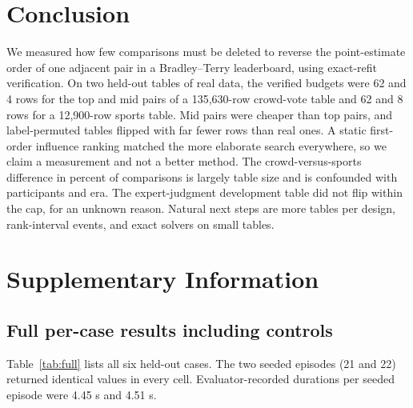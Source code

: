 \documentclass{article}
\begin{document}
\section{Conclusion}
We measured how few comparisons must be deleted to reverse the point-estimate order of one adjacent pair in a Bradley--Terry leaderboard, using exact-refit verification. On two held-out tables of real data, the verified budgets were 62 and 4 rows for the top and mid pairs of a 135,630-row crowd-vote table and 62 and 8 rows for a 12,900-row sports table. Mid pairs were cheaper than top pairs, and label-permuted tables flipped with far fewer rows than real ones. A static first-order influence ranking matched the more elaborate search everywhere, so we claim a measurement and not a better method. The crowd-versus-sports difference in percent of comparisons is largely table size and is confounded with participants and era. The expert-judgment development table did not flip within the cap, for an unknown reason. Natural next steps are more tables per design, rank-interval events, and exact solvers on small tables.\label{lastbodypage}

\clearpage



\clearpage
\appendix
\section{Supplementary Information}

\subsection{Full per-case results including controls}
Table~\ref{tab:full} lists all six held-out cases. The two seeded episodes (21 and 22) returned identical values in every cell. Evaluator-recorded durations per seeded episode were 4.45 s and 4.51 s.
\end{document}
